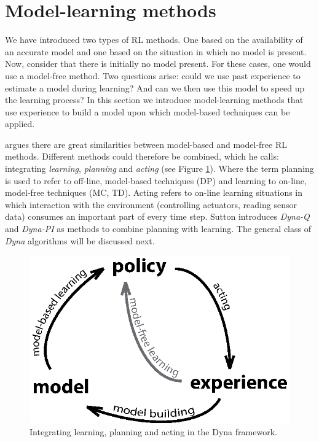 \documentclass[a4paper,11pt]{mscLiterature}
\begin{document}
		\section{Model-learning methods} \label{sec:modelLearningMethods}
		We have introduced two types of RL methods. One based on the availability of an accurate model and one based on the situation in which no model is present. Now, consider that there is initially no model present. For these cases, one would use a model-free method. Two questions arise: could we use past experience to estimate a model during learning? And can we then use this model to speed up the learning process? In this section we introduce model-learning methods that use experience to build a model upon which model-based techniques can be applied. 
		
		\cite{Sutton:90} argues there are great similarities between model-based and model-free RL methods. Different methods could therefore be combined, which he calls: integrating \emph{learning}, \emph{planning} and \emph{acting} (see Figure \ref{fig:integratingLearningPlanningActing}). Where the term planning is used to refer to off-line, model-based techniques (DP) and learning to on-line, model-free techniques (MC, TD). Acting refers to on-line learning situations in which interaction with the environment (controlling actuators, reading sensor data) consumes an important part of every time step. Sutton introduces \emph{Dyna-Q} and \emph{Dyna-PI} as methods to combine planning with learning. The general class of \emph{Dyna} algorithms will be discussed next.		
\begin{figure}[htbp]
	\centering
		\includegraphics[width=300 pt]{img/LearningPlanningActing}
	\caption{Integrating learning, planning and acting in the Dyna framework.}
	\label{fig:integratingLearningPlanningActing}
\end{figure}
				
\end{document}
